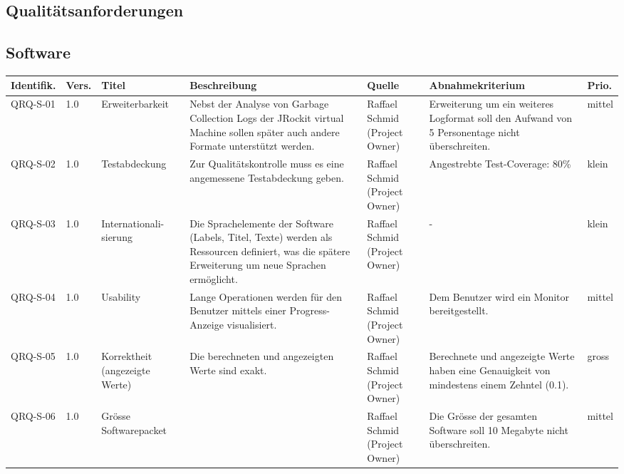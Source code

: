 \begin{landscape}
\section{Qualitätsanforderungen}
\subsection{Software}\label{anforderungen_software}
\begin{longtable}{|p{1.6cm}|p{0.7cm}|p{2.5cm}|p{4.5cm}|p{2.6cm}|p{4cm}|p{0.9cm}|}
    \hline
    \textbf{Identifik.} & \textbf{Vers.}& \textbf{Titel} & \textbf{Beschreibung} & \textbf{Quelle} & \textbf{Abnahmekriterium} & \textbf{Prio.}\\\hline
   QRQ-S-01 & 1.0 & Erweiterbarkeit & Nebst der Analyse von Garbage Collection Logs der JRockit virtual Machine sollen später auch andere Formate unterstützt werden. & Raffael Schmid (Project Owner) & Erweiterung um ein weiteres Logformat soll den Aufwand von 5 Personentage nicht überschreiten. & mittel \\\hline
   QRQ-S-02 & 1.0 & Testabdeckung & Zur Qualitätskontrolle muss es eine angemessene Testabdeckung geben. & Raffael Schmid (Project Owner) & Angestrebte Test-Coverage: 80\% & klein \\\hline

  QRQ-S-03 & 1.0 & Internationali-sierung & Die Sprachelemente der Software (Labels, Titel, Texte) werden als Ressourcen definiert, was die spätere Erweiterung um neue Sprachen ermöglicht. & Raffael Schmid (Project Owner) & - & klein\\\hline

   QRQ-S-04 & 1.0 & Usability &Lange Operationen werden für den Benutzer mittels einer Progress-Anzeige visualisiert. & Raffael Schmid (Project Owner) & Dem Benutzer wird ein Monitor bereitgestellt.&mittel \\\hline

  QRQ-S-05 & 1.0 & Korrektheit (angezeigte Werte) & Die berechneten und angezeigten Werte sind exakt. & Raffael Schmid (Project Owner) & Berechnete und angezeigte Werte haben eine Genauigkeit von mindestens einem Zehntel (0.1). & gross\\\hline
  
QRQ-S-06 & 1.0 & Grösse Softwarepacket & & Raffael Schmid (Project Owner) & Die Grösse der gesamten Software soll 10 Megabyte nicht überschreiten. & mittel\\\hline


\end{longtable}
\end{landscape}
